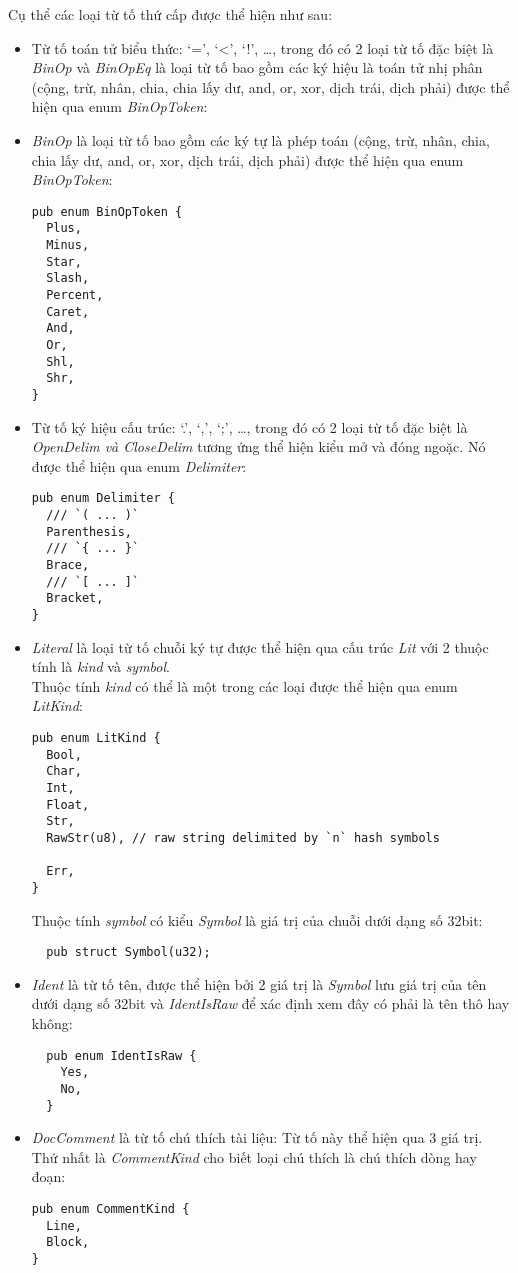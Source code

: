 Cụ thể các loại từ tố thứ cấp được thể hiện như sau:
\begin{itemize}
  \item Từ tố toán tử biểu thức: `=', `<', `!', \dots, trong đó có 2 loại từ tố đặc biệt là \textit{BinOp} và \textit{BinOpEq} là loại từ tố bao gồm các ký hiệu là toán tử nhị phân (cộng, trừ, nhân, chia, chia lấy dư, and, or, xor, dịch trái, dịch phải) được thể hiện qua enum \textit{BinOpToken}:
  \item \textit{BinOp} là loại từ tố bao gồm các ký tự là phép toán (cộng, trừ, nhân, chia, chia lấy dư, and, or, xor, dịch trái, dịch phải) được thể hiện qua enum \textit{BinOpToken}:
\begin{lstlisting}
pub enum BinOpToken {
  Plus,
  Minus,
  Star,
  Slash,
  Percent,
  Caret,
  And,
  Or,
  Shl,
  Shr,
}
\end{lstlisting}
  \item Từ tố ký hiệu cấu trúc: `.', `,', `;', \dots, trong đó có 2 loại từ tố đặc biệt là \textit{OpenDelim \emph{và} CloseDelim} tương ứng thể hiện kiểu mở và đóng ngoặc. Nó được thể hiện qua enum \textit{Delimiter}:
\begin{lstlisting}
pub enum Delimiter {
  /// `( ... )`
  Parenthesis,
  /// `{ ... }`
  Brace,
  /// `[ ... ]`
  Bracket,
}        
\end{lstlisting}
  \item \textit{Literal} là loại từ tố chuỗi ký tự được thể hiện qua cấu trúc \textit{Lit} với 2 thuộc tính là \textit{kind} và \textit{symbol}. 
  \\Thuộc tính \textit{kind} có thể là một trong các loại được thể hiện qua enum \textit{LitKind}: 
\begin{lstlisting}
pub enum LitKind {
  Bool,
  Char,
  Int,
  Float,
  Str,
  RawStr(u8), // raw string delimited by `n` hash symbols

  Err,
}
\end{lstlisting}
  Thuộc tính \textit{symbol} có kiểu \textit{Symbol} là giá trị của chuỗi dưới dạng số 32bit:
\begin{lstlisting}
  pub struct Symbol(u32);
\end{lstlisting}
  \item \textit{Ident} là từ tố tên, được thể hiện bởi 2 giá trị là \textit{Symbol} lưu giá trị của tên dưới dạng số 32bit và \textit{IdentIsRaw} để xác định xem đây có phải là tên thô hay không:
\begin{lstlisting}
  pub enum IdentIsRaw {
    Yes,
    No,
  }
\end{lstlisting}
  \item \textit{DocComment} là từ tố chú thích tài liệu:
        Từ tố này thể hiện qua 3 giá trị. 
        \\Thứ nhất là \textit{CommentKind} cho biết loại chú thích là chú thích dòng hay đoạn:
\begin{lstlisting}
pub enum CommentKind {
  Line,
  Block,
}
\end{lstlisting}


\end{itemize}

